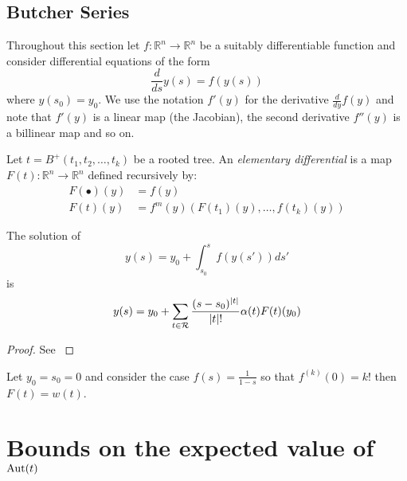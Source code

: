  \subsection{Butcher Series}
 Throughout this section let $f: \mathbb{R}^n \rightarrow \mathbb{R}^n$ be a suitably differentiable function and consider differential equations of the form 
 \[
  \frac{d}{ds}{y(s)} = f(y(s))
 \]
where $y(s_0) = y_0$.  We use the notation $f'(y)$ for the derivative $\frac{d}{dy}f(y)$ and note that $f'(y)$ is a linear map (the Jacobian), the second derivative $f''(y)$ is a billinear map and so on. 

\begin{defn}
Let $t = B^{+}(t_1,t_2,\dots,t_k)$ be  a rooted tree. An \emph{elementary differential} is a map  $F(t):  \mathbb{R}^n \rightarrow \mathbb{R}^n$ defined 
recursively by:
\begin{align}
 F(\bullet)(y) &= f(y) \\%
 F(t)(y) &= f^{m}(y)(F(t_1)(y),\dots,f(t_k)(y))
 \end{align}
\end{defn}
\begin{theorem}\label{Butcher}
 The solution of 
 \[
  y(s) = y_0 + \int_{s_0}^{s} f(y(s')) ds'
 \]
is
\[
 y(s) = y_0 + \sum_{t \in \operatorname{\mathcal{R}}} \frac{(s-s_0)^{\lvert t \rvert}}{\lvert t \rvert !}\alpha(t)F(t)(y_0)
\]
\end{theorem}

\begin{proof}
 See \cite{Butcher,Brouder}
\end{proof}

\begin{ex}\label{ex:1}
 Let $y_0 = s_0 = 0$  and consider the case $f(s) = \frac{1}{1-s}$ so that  $f^{(k)}(0) = k!$ then $F(t) = w(t)$.
\end{ex}


\section{Bounds on the expected value of $\operatorname{Aut}(t)$}\label{sec:bounds}
